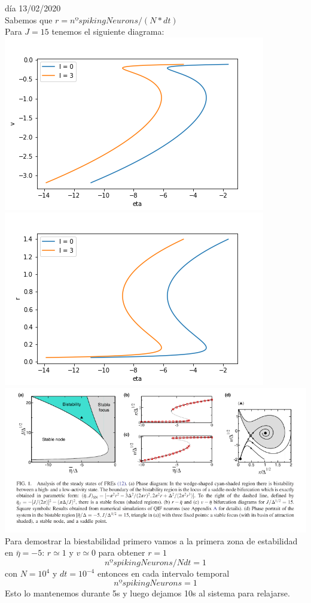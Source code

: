 \documentclass[a4paper]{article}
\begin{document}
día 13/02/2020\\
Sabemos que $r = nºspiking Neurons/(N*dt)$\\
Para $J = 15$ tenemos el siguiente diagrama:\\
\includegraphics[scale=0.7]{v_vs_eta_J15.png}\\
\includegraphics[scale=0.7]{r_vs_eta_J15.png}\\
\includegraphics[scale=0.4]{diagramaspaper.png}\\
Para demostrar la biestabilidad primero vamos a la primera zona de estabilidad en $ \bar{\eta} = -5$:
$r\simeq 1$ y $ v\simeq 0$
para obtener  $r = 1$
$$nºspikingNeurons/Ndt = 1$$
con $N = 10^4$ y $dt = 10^{-4}$
entonces en cada intervalo temporal
$$nºspikingNeurons = 1$$
Esto lo mantenemos durante 5s y luego dejamos 10s al sistema para relajarse.
\end{document}
